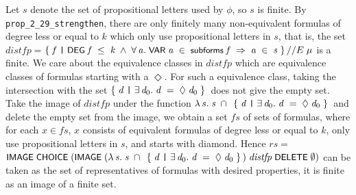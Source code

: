 \documentclass[letterpaper]{article}
\renewcommand{\HOLConst}[1]{{\textsf{\upshape\small #1}}}
\renewcommand{\HOLinline}[1]{\ensuremath{#1}}
\begin{document}
Let $s$ denote the set of propositional letters used by $\phi$, so $s$ is finite. By \texttt{prop_2_29_strengthen}, there are only finitely many non-equivalent formulas of degree less or equal to $k$ which only use propositional letters in $s$, that is, the set $distfp=$\HOLinline{\HOLTokenLeftbrace{}\HOLBoundVar{f}\;\HOLTokenBar{}\;\HOLConst{DEG}\;\HOLBoundVar{f}\;\HOLSymConst{\HOLTokenLeq{}}\;\HOLFreeVar{k}\;\HOLSymConst{\HOLTokenConj{}}\;\HOLSymConst{\HOLTokenForall{}}\HOLBoundVar{a}.\;\HOLConst{VAR}\;\HOLBoundVar{a}\;\HOLSymConst{\HOLTokenIn{}}\;\HOLConst{subforms}\;\HOLBoundVar{f}\;\HOLSymConst{\HOLTokenImp{}}\;\HOLBoundVar{a}\;\HOLSymConst{\HOLTokenIn{}}\;\HOLFreeVar{s}\HOLTokenRightbrace{}\HOLSymConst{//E}\;\HOLFreeVar{\ensuremath{\mu}}} is a finite. We care about the equivalence classes in $distfp$ which are equivalence classes of formulas starting with a $\Diamond$. For such a equivalence class, taking the intersection with the set \HOLinline{\HOLTokenLeftbrace{}\HOLBoundVar{d}\;\HOLTokenBar{}\;\HOLSymConst{\HOLTokenExists{}}\HOLBoundVar{d\sb{\mathrm{0}}}.\;\HOLBoundVar{d}\;\HOLSymConst{=}\;\HOLSymConst{\ensuremath{\Diamond}}\;\HOLBoundVar{d\sb{\mathrm{0}}}\HOLTokenRightbrace{}} does not give the empty set. Take the image of $distfp$ under the function \HOLinline{\HOLTokenLambda{}\HOLBoundVar{s}.\;\HOLBoundVar{s}\;\HOLSymConst{\HOLTokenInter{}}\;\HOLTokenLeftbrace{}\HOLBoundVar{d}\;\HOLTokenBar{}\;\HOLSymConst{\HOLTokenExists{}}\HOLBoundVar{d\sb{\mathrm{0}}}.\;\HOLBoundVar{d}\;\HOLSymConst{=}\;\HOLSymConst{\ensuremath{\Diamond}}\;\HOLBoundVar{d\sb{\mathrm{0}}}\HOLTokenRightbrace{}} and delete the empty set from the image, we obtain a set $fs$ of sets of formulas, where for each $x\in fs$, $x$ consists of equivalent formulas of degree less or equal to $k$, only use propositional letters in $s$, and starts with diamond. Hence 
$rs=$\HOLinline{\HOLConst{IMAGE}\;\HOLConst{CHOICE}\;(\HOLConst{IMAGE}\;(\HOLTokenLambda{}\HOLBoundVar{s}.\;\HOLBoundVar{s}\;\HOLSymConst{\HOLTokenInter{}}\;\HOLTokenLeftbrace{}\HOLBoundVar{d}\;\HOLTokenBar{}\;\HOLSymConst{\HOLTokenExists{}}\HOLBoundVar{d\sb{\mathrm{0}}}.\;\HOLBoundVar{d}\;\HOLSymConst{=}\;\HOLSymConst{\ensuremath{\Diamond}}\;\HOLBoundVar{d\sb{\mathrm{0}}}\HOLTokenRightbrace{})\;\HOLFreeVar{distfp}\;\HOLConst{DELETE}\;\HOLSymConst{\HOLTokenEmpty{}})} can be taken as the set of representatives of formulas with desired properties, it is finite as an image of a finite set. 
\end{document}
